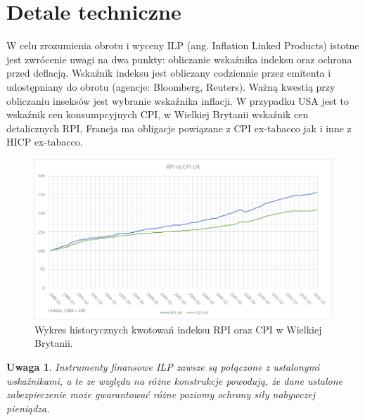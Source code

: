 \documentclass{mini}
\theoremstyle{mythstyle}
\newtheorem{Uwaga}{Uwaga}[chapter]
\begin{document}
	\section{Detale techniczne}
	
	W celu zrozumienia obrotu i wyceny ILP (ang. Inflation Linked Products) istotne jest zwrócenie uwagi na dwa punkty: obliczanie wskaźnika indeksu oraz ochrona przed deflacją. Wskaźnik indeksu jest obliczany codziennie przez emitenta i udostępniany do obrotu (agencje: Bloomberg, Reuters). Ważną kwestią przy obliczaniu inseksów jest wybranie wskaźnika inflacji. W przypadku USA jest to wskaźnik cen konsumpcyjnych CPI, w Wielkiej Brytanii wskaźnik cen detalicznych RPI, Francja ma obligacje powiązane z CPI ex-tabacco jak i inne z HICP ex-tabacco. \\
		\begin{figure} [!h]
		\centering
		\includegraphics[scale=0.65]{graphics/rpivscpi.png}
		\caption{Wykres historycznych kwotowań indeksu RPI oraz CPI w Wielkiej Brytanii.}
	\end{figure}

	\begin{Uwaga}
			Instrumenty finansowe ILP zawsze są połączone z ustalonymi wskaźnikami, a te ze względu na różne konstrukcje powodują, że dane ustalone zabezpieczenie może gwarantować różne poziomy ochrony siły nabywczej pieniądza.
	\end{Uwaga}
\end{document}

